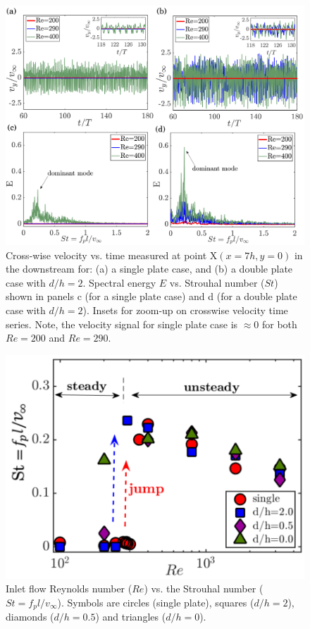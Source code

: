 \documentclass[aps,pre,twocolumn,aps,longbibliography]{revtex4-1}
\begin{document}
	
	\begin{figure}[b]
		\begin{minipage}[c]{1\linewidth}
			\includegraphics[width=1\linewidth]{Fig12.pdf} 
		\end{minipage} 
		\caption{Cross-wise velocity vs. time measured at point {\normalsize{X}}$(x=7h,y=0)$ in the downstream for: (a) a single plate case, and (b) a double plate case with $d/h=2$. Spectral energy $E$ vs. Strouhal number ($St$) shown in panels c (for a single plate case) and d (for a double plate case with $d/h=2$). Insets for zoom-up on crosswise velocity time series. Note, the velocity signal for single plate case is $\approx0$ for both $Re=200$ and $Re=290$.}
		\label{fig:t_vs_vy}
		
	\end{figure} 
	
	
	\begin{figure}
		\begin{minipage}[c]{1\linewidth}
			\includegraphics[width=0.90\linewidth]{Fig13.pdf} 
		\end{minipage} 
		\caption{Inlet flow Reynolds number ($Re$) vs. the Strouhal number ($St=f_pl/{v_{\infty}}$). Symbols are circles (single plate), squares ($d/h=2$), diamonds ($d/h=0.5$) and triangles ($d/h=0$).}
		\label{fig:Re_vs_St}
	\end{figure}
	
\end{document}
